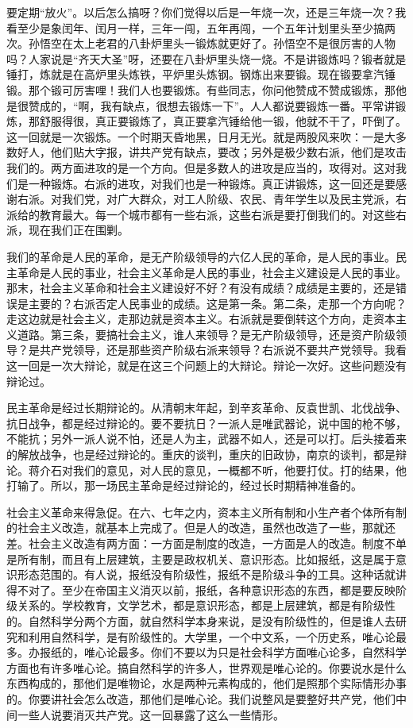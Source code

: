 要定期“放火”。以后怎么搞呀？你们觉得以后是一年烧一次，还是三年烧一次？我看至少是象闰年、闰月一样，三年一闯，五年再闯，一个五年计划里头至少搞两次。孙悟空在太上老君的八卦炉里头一锻炼就更好了。孙悟空不是很厉害的人物吗？人家说是“齐天大圣”呀，还要在八卦炉里头烧一烧。不是讲锻炼吗？锻者就是锤打，炼就是在高炉里头炼铁，平炉里头炼钢。钢炼出来要锻。现在锻要拿汽锤锻。那个锻可厉害哩！我们人也要锻炼。有些同志，你问他赞成不赞成锻炼，那他是很赞成的，“啊，我有缺点，很想去锻炼一下”。人人都说要锻炼一番。平常讲锻炼，那舒服得很，真正要锻炼了，真正要拿汽锤给他一锻，他就不干了，吓倒了。这一回就是一次锻炼。一个时期天昏地黑，日月无光。就是两股风来吹：一是大多数好人，他们贴大字报，讲共产党有缺点，要改；另外是极少数右派，他们是攻击我们的。两方面进攻的是一个方向。但是多数人的进攻是应当的，攻得对。这对我们是一种锻炼。右派的进攻，对我们也是一种锻炼。真正讲锻炼，这一回还是要感谢右派。对我们党，对广大群众，对工人阶级、农民、青年学生以及民主党派，右派给的教育最大。每一个城市都有一些右派，这些右派是要打倒我们的。对这些右派，现在我们正在围剿。

我们的革命是人民的革命，是无产阶级领导的六亿人民的革命，是人民的事业。民主革命是人民的事业，社会主义革命是人民的事业，社会主义建设是人民的事业。那末，社会主义革命和社会主义建设好不好？有没有成绩？成绩是主要的，还是错误是主要的？右派否定人民事业的成绩。这是第一条。第二条，走那一个方向呢？走这边就是社会主义，走那边就是资本主义。右派就是要倒转这个方向，走资本主义道路。第三条，要搞社会主义，谁人来领导？是无产阶级领导，还是资产阶级领导？是共产党领导，还是那些资产阶级右派来领导？右派说不要共产党领导。我看这一回是一次大辩论，就是在这三个问题上的大辩论。辩论一次好。这些问题没有辩论过。

民主革命是经过长期辩论的。从清朝末年起，到辛亥革命、反袁世凯、北伐战争、抗日战争，都是经过辩论的。要不要抗日？一派人是唯武器论，说中国的枪不够，不能抗；另外一派人说不怕，还是人为主，武器不如人，还是可以打。后头接着来的解放战争，也是经过辩论的。重庆的谈判，重庆的旧政协，南京的谈判，都是辩论。蒋介石对我们的意见，对人民的意见，一概都不听，他要打仗。打的结果，他打输了。所以，那一场民主革命是经过辩论的，经过长时期精神准备的。

社会主义革命来得急促。在六、七年之内，资本主义所有制和小生产者个体所有制的社会主义改造，就基本上完成了。但是人的改造，虽然也改造了一些，那就还差。社会主义改造有两方面：一方面是制度的改造，一方面是人的改造。制度不单是所有制，而且有上层建筑，主要是政权机关、意识形态。比如报纸，这是属于意识形态范围的。有人说，报纸没有阶级性，报纸不是阶级斗争的工具。这种话就讲得不对了。至少在帝国主义消灭以前，报纸，各种意识形态的东西，都是要反映阶级关系的。学校教育，文学艺术，都是意识形态，都是上层建筑，都是有阶级性的。自然科学分两个方面，就自然科学本身来说，是没有阶级性的，但是谁人去研究和利用自然科学，是有阶级性的。大学里，一个中文系，一个历史系，唯心论最多。办报纸的，唯心论最多。你们不要以为只是社会科学方面唯心论多，自然科学方面也有许多唯心论。搞自然科学的许多人，世界观是唯心论的。你要说水是什么东西构成的，那他们是唯物论，水是两种元素构成的，他们是照那个实际情形办事的。你要讲社会怎么改造，那他们是唯心论。我们说整风是要整好共产党，他们中间一些人说要消灭共产党。这一回暴露了这么一些情形。

